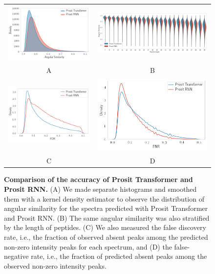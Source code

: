 \documentclass[10pt,a4paper]{article}
\begin{document}
\begin{figure}[tbh!]
    \centering
    \begin{tabular}{cc}
    \includegraphics[width=6cm]{./img/spectralAngleDist.png} & \includegraphics[width=8cm]{./img/violin_sa_pepLen.png}\\
    A & B \\
    \includegraphics[width=6cm]{./img/fdr.png} & \includegraphics[width=6cm]{./img/fnr.png} \\
    C & D
    \end{tabular}
    \caption{{\bf Comparison of the accuracy of Prosit Transformer and Prosit RNN.} (A) We made separate histograms and smoothed them with a kernel density estimator to observe the distribution of angular similarity for the spectra predicted with Prosit Transformer and Prosit RNN. (B) The same angular similarity was also stratified by the length of peptides. (C) We also measured the false discovery rate, i.e., the fraction of observed absent peaks among the predicted non-zero intensity peaks for each spectrum, and (D) the false-negative rate, i.e., the fraction of predicted absent peaks among the observed non-zero intensity peaks.\label{fig:performance}}
    \end{figure}
\end{document}
